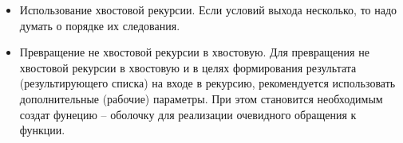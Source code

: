 \begin{itemize}
    \item Использование хвостовой рекурсии.
        Если условий выхода несколько, то надо думать о порядке их следования.
    \item Превращение не хвостовой рекурсии в хвостовую.
        Для превращения не хвостовой рекурсии в хвостовую и в целях
        формирования результата (результирующего списка) на входе в
        рекурсию, рекомендуется использовать дополнительные (рабочие)
        параметры. При этом становится необходимым создат фунецию --
        оболочку для реализации очевидного обращения к функции.
\end{itemize}
